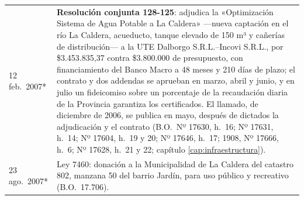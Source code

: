 \begin{longtable}{@{}p{2.7cm}p{10.3cm}@{}}
12 feb.\ 2007* & \textbf{Resolución conjunta 128-125}: adjudica la «Optimización Sistema de Agua Potable a La Caldera» ---nueva captación en el río La Caldera, acueducto, tanque elevado de 150 m³ y cañerías de distribución--- a la UTE Dalborgo S.R.L.--Incovi S.R.L., por \$3.453.835,37 contra \$3.800.000 de presupuesto, con financiamiento del Banco Macro a 48 meses y 210 días de plazo; el contrato y dos addendas se aprueban en marzo, abril y junio, y en julio un fideicomiso sobre un porcentaje de la recaudación diaria de la Provincia garantiza los certificados. El llamado, de diciembre de 2006, se publica en mayo, después de dictados la adjudicación y el contrato (B.O.\ Nº 17630, h.\ 16; Nº 17631, h.\ 14; Nº 17604, h.\ 19 y 20; Nº 17646, h.\ 17; 1908, Nº 17666, h.\ 6; Nº 17628, h.\ 21 y 22; capítulo \ref{cap:infraestructura}). \\
23 ago.\ 2007* & Ley 7460: donación a la Municipalidad de La Caldera del catastro 802, manzana 50 del barrio Jardín, para uso público y recreativo (B.O.\ 17.706). \\

\end{longtable}
